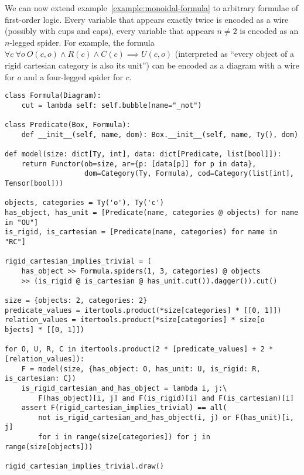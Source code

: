\begin{example}
We can now extend example~\ref{example:monoidal-formula} to arbitrary formulae of first-order logic.
Every variable that appears exactly twice is encoded as a wire (possibly with cups and caps), every variable that appears $n \neq 2$ is encoded as an $n$-legged spider.
For example, the formula $\forall c \ \forall o \ O(c, o) \land R(c) \land C(c) \implies U(c, o)$ (interpreted as ``every object of a rigid cartesian category is also its unit'') can be encoded as a diagram with a wire for $o$ and a four-legged spider for $c$.

\begin{verbatim}
class Formula(Diagram):
    cut = lambda self: self.bubble(name="_not")

class Predicate(Box, Formula):
    def __init__(self, name, dom): Box.__init__(self, name, Ty(), dom)

def model(size: dict[Ty, int], data: dict[Predicate, list[bool]]):
    return Functor(ob=size, ar={p: [data[p]] for p in data},
                   dom=Category(Ty, Formula), cod=Category(list[int], Tensor[bool]))

objects, categories = Ty('o'), Ty('c')
has_object, has_unit = [Predicate(name, categories @ objects) for name in "OU"]
is_rigid, is_cartesian = [Predicate(name, categories) for name in "RC"]

rigid_cartesian_implies_trivial = (
    has_object >> Formula.spiders(1, 3, categories) @ objects
    >> (is_rigid @ is_cartesian @ has_unit.cut()).dagger()).cut()

size = {objects: 2, categories: 2}
predicate_values = itertools.product(*size[categories] * [[0, 1]])
relation_values = itertools.product(*size[categories] * size[o  bjects] * [[0, 1]])

for O, U, R, C in itertools.product(2 * [predicate_values] + 2 * [relation_values]):
    F = model(size, {has_object: O, has_unit: U, is_rigid: R, is_cartesian: C})
    is_rigid_cartesian_and_has_object = lambda i, j:\
        F(has_object)[i, j] and F(is_rigid)[i] and F(is_cartesian)[i]
    assert F(rigid_cartesian_implies_trivial) == all(
        not is_rigid_cartesian_and_has_object(i, j) or F(has_unit)[i, j]
        for i in range(size[categories]) for j in range(size[objects]))

rigid_cartesian_implies_trivial.draw()
\end{verbatim}

\end{example}

